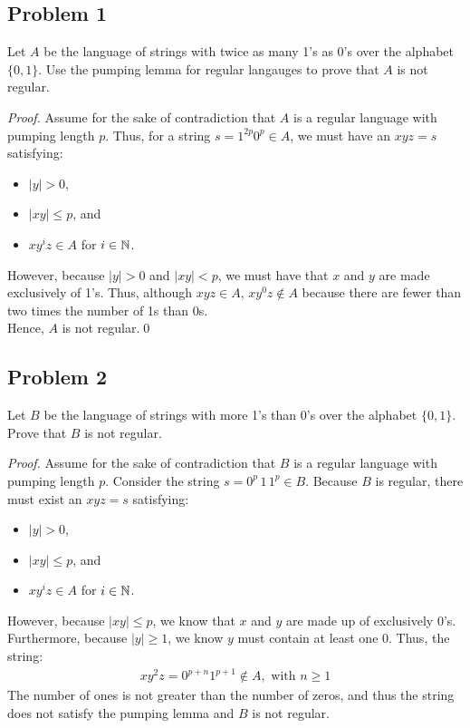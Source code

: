 \documentclass[10pt,oneside]{book}
\newcommand{\gspc}{\vspace{0.13cm}} %
\newcommand{\gline}[0]{\gspc\\} %
\newenvironment{problem}[1]
  {\vspace{-0.1cm}\begin{tcolorbox}[problembox]
   \textit{Proof. }#1}
  {\end{tcolorbox}\gspc}
\begin{document}
\subsection*{Problem 1}
Let $A$ be the language of strings with twice as many 1's as 0's over the alphabet $\{0, 1\}$. Use the pumping lemma for regular langauges to prove that $A$ is not regular. 
\begin{problem}
  Assume for the sake of contradiction that $A$ is a regular language with pumping length $p$. Thus, for a string $s = 1^{2p}0^p\in A$, we must have an $xyz = s$ satisfying:
  \begin{itemize}[itemsep=0pt, parsep=0pt]
    \item $|y|> 0$, 
    \item $|xy| \le p$, and
    \item $xy^iz \in A$ for $i \in \mathbb{N}$. 
  \end{itemize}
  However, because $|y|>0$ and $|xy| < p$, we must have that $x$ and $y$ are made exclusively of 1's. Thus, although $xyz \in A$, $xy^0z\notin A$ because there are fewer than two times the number of 1s than 0s. \gline{}
  Hence, $A$ is not regular.\qed
\end{problem}

\subsection*{Problem 2}
Let $B$ be the language of strings with more 1's than 0's over the alphabet $\{0, 1\}$. Prove that $B$ is not regular. 
\begin{problem}
  Assume for the sake of contradiction that $B$ is a regular language with pumping length $p$. Consider the string $\displaystyle s = 0^p\,1\,1^p\in B$. Because $B$ is regular, there must exist an $xyz = s$ satisfying:
  \begin{itemize}[itemsep=0pt, parsep=0pt]
    \item $|y|> 0$, 
    \item $|xy| \le p$, and
    \item $xy^iz \in A$ for $i \in \mathbb{N}$. 
  \end{itemize}
  However, because $|xy|\le p$, we know that $x$ and $y$ are made up of exclusively 0's. Furthermore, because $|y|\ge 1$, we know $y$ must contain at least one 0. Thus, the string:
  \begin{align*}
    xy^2z = 0^{p+n}1^{p+1}\notin A, \text{ with }n \ge 1
  \end{align*}
  The number of ones is not greater than the number of zeros, and thus the string does not satisfy the pumping lemma and $B$ is not regular.  
\end{problem}
\end{document}
